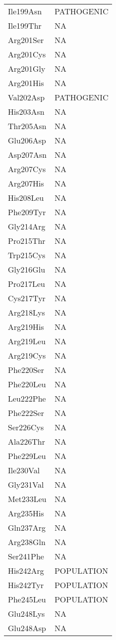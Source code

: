 \begin{tiny}
\begin{longtable}[l]{l|l}
	Ile199Asn & PATHOGENIC \\
	Ile199Thr & NA \\
	Arg201Ser & NA \\
	Arg201Cys & NA \\
	Arg201Gly & NA \\
	Arg201His & NA \\
	Val202Asp & PATHOGENIC \\
	His203Asn & NA \\
	Thr205Asn & NA \\
	Glu206Asp & NA \\
	Asp207Asn & NA \\
	Arg207Cys & NA \\
	Arg207His & NA \\
	His208Leu & NA \\
	Phe209Tyr & NA \\
	Gly214Arg & NA \\
	Pro215Thr & NA \\
	Trp215Cys & NA \\
	Gly216Glu & NA \\
	Pro217Leu & NA \\
	Cys217Tyr & NA \\
	Arg218Lys & NA \\
	Arg219His & NA \\
	Arg219Leu & NA \\
	Arg219Cys & NA \\
	Phe220Ser & NA \\
	Phe220Leu & NA \\
	Leu222Phe & NA \\
	Phe222Ser & NA \\
	Ser226Cys & NA \\
	Ala226Thr & NA \\
	Phe229Leu & NA \\
	Ile230Val & NA \\
	Gly231Val & NA \\
	Met233Leu & NA \\
	Arg235His & NA \\
	Gln237Arg & NA \\
	Arg238Gln & NA \\
	Ser241Phe & NA \\
	His242Arg & POPULATION \\
	His242Tyr & POPULATION \\
	Phe245Leu & POPULATION \\
	Glu248Lys & NA \\
	Glu248Asp & NA \\

\end{longtable}
\end{tiny}
